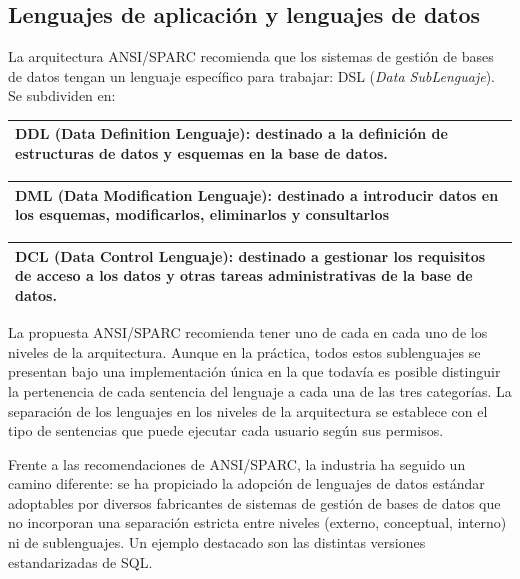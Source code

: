 \documentclass[10pt,a4paper,spanish]{report}
\begin{document}
\textcolor[rgb]{1,0.2,0.3}{\section{Lenguajes de aplicación y lenguajes de datos}}
La arquitectura ANSI/SPARC recomienda que los sistemas de gestión de bases de datos tengan un lenguaje específico para trabajar: DSL (\textcolor[rgb]{1,0.2,0.3}{\textit{Data SubLenguaje}}). Se subdividen en:

\begin{center}
\begin{tabular}{|p{12cm}|}
\hline
\textcolor[rgb]{1,0.2,0.3}{\textbf{DDL (Data Definition Lenguaje)}}: destinado a la definición de estructuras de datos y esquemas en la base de datos. \\
\hline
\end{tabular}

\begin{tabular}{|p{12cm}|}
\hline
\textcolor[rgb]{1,0.2,0.3}{\textbf{DML (Data Modification Lenguaje)}}: destinado a introducir datos en los esquemas, modificarlos, eliminarlos y consultarlos \\
\hline
\end{tabular}

\begin{tabular}{|p{12cm}|}
\hline
\textcolor[rgb]{1,0.2,0.3}{\textbf{DCL (Data Control Lenguaje)}}: destinado a gestionar los requisitos de acceso a los datos y otras tareas administrativas de la base de datos. \\
\hline
\end{tabular}
\end{center}

La propuesta ANSI/SPARC recomienda tener uno de cada en cada uno de los niveles de la arquitectura. Aunque en la práctica, todos estos sublenguajes se presentan bajo una implementación única en la que todavía es posible distinguir la pertenencia de cada sentencia del lenguaje a cada una de las tres categorías. La separación de los lenguajes en los niveles de la arquitectura se establece con el tipo de sentencias que puede ejecutar cada usuario según sus permisos.

Frente a las recomendaciones de ANSI/SPARC, la industria ha seguido un camino diferente: se ha propiciado la adopción de lenguajes de datos estándar adoptables por diversos fabricantes de sistemas de gestión de bases de datos que no incorporan una separación estricta entre niveles (externo, conceptual, interno) ni de sublenguajes. Un ejemplo destacado son las distintas versiones estandarizadas de SQL.
\end{document}

